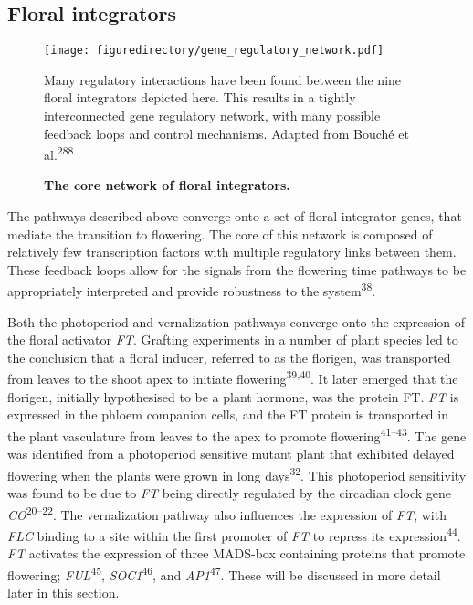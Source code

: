 \documentclass[12pt,]{book}
\begin{document}
\subsection{Floral integrators}\label{section:intro:floralintegrators}

\begin{figure}[htbp]
\texttt{[image: figuredirectory/gene\_regulatory\_network.pdf]}
\caption{\textbf{The core network of floral integrators.}}{Many
regulatory interactions have been found between the nine floral
integrators depicted here. This results in a tightly interconnected gene
regulatory network, with many possible feedback loops and control
mechanisms. Adapted from Bouché et
al.\textsuperscript{288}}\label{figure:1xx:floralnetwork}
\end{figure}

The pathways described above converge onto a set of floral integrator
genes, that mediate the transition to flowering. The core of this
network is composed of relatively few transcription factors with
multiple regulatory links between them. These feedback loops allow for
the signals from the flowering time pathways to be appropriately
interpreted and provide robustness to the system\textsuperscript{38}.

Both the photoperiod and vernalization pathways converge onto the
expression of the floral activator \emph{FT}. Grafting experiments in a
number of plant species led to the conclusion that a floral inducer,
referred to as the florigen, was transported from leaves to the shoot
apex to initiate flowering\textsuperscript{39,40}. It later emerged that
the florigen, initially hypothesised to be a plant hormone, was the
protein FT. \emph{FT} is expressed in the phloem companion cells, and
the FT protein is transported in the plant vasculature from leaves to
the apex to promote flowering\textsuperscript{41--43}. The gene was
identified from a photoperiod sensitive mutant plant that exhibited
delayed flowering when the plants were grown in long
days\textsuperscript{32}. This photoperiod sensitivity was found to be
due to \emph{FT} being directly regulated by the circadian clock gene
\emph{CO}\textsuperscript{20--22}. The vernalization pathway also
influences the expression of \emph{FT}, with \emph{FLC} binding to a
site within the first promoter of \emph{FT} to repress its
expression\textsuperscript{44}. \emph{FT} activates the expression of
three MADS-box containing proteins that promote flowering;
\emph{FUL}\textsuperscript{45}, \emph{SOC1}\textsuperscript{46}, and
\emph{AP1}\textsuperscript{47}. These will be discussed in more detail
later in this section.
\end{document}
